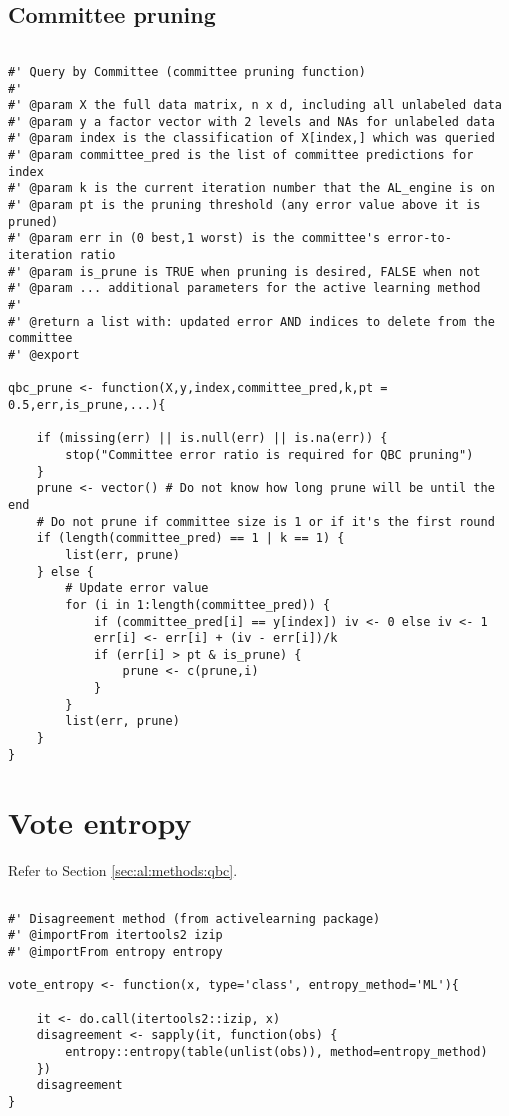 \subsection{Committee pruning}
{
\begin{lstlisting}

#' Query by Committee (committee pruning function)
#'
#' @param X the full data matrix, n x d, including all unlabeled data
#' @param y a factor vector with 2 levels and NAs for unlabeled data
#' @param index is the classification of X[index,] which was queried
#' @param committee_pred is the list of committee predictions for index
#' @param k is the current iteration number that the AL_engine is on
#' @param pt is the pruning threshold (any error value above it is pruned)
#' @param err in (0 best,1 worst) is the committee's error-to-iteration ratio
#' @param is_prune is TRUE when pruning is desired, FALSE when not
#' @param ... additional parameters for the active learning method
#'
#' @return a list with: updated error AND indices to delete from the committee
#' @export

qbc_prune <- function(X,y,index,committee_pred,k,pt = 0.5,err,is_prune,...){

	if (missing(err) || is.null(err) || is.na(err)) {
		stop("Committee error ratio is required for QBC pruning")
	}
	prune <- vector() # Do not know how long prune will be until the end
	# Do not prune if committee size is 1 or if it's the first round
	if (length(committee_pred) == 1 | k == 1) {
		list(err, prune)
	} else {
		# Update error value
		for (i in 1:length(committee_pred)) {
			if (committee_pred[i] == y[index]) iv <- 0 else iv <- 1
			err[i] <- err[i] + (iv - err[i])/k
			if (err[i] > pt & is_prune) {
				prune <- c(prune,i)
			}
		}
		list(err, prune)
	}
}
\end{lstlisting}
}

\section{Vote entropy}
\label{sec:appendicies:al:entropy}

Refer to Section \ref{sec:al:methods:qbc}.
{
\begin{lstlisting}

#' Disagreement method (from activelearning package)
#' @importFrom itertools2 izip
#' @importFrom entropy entropy

vote_entropy <- function(x, type='class', entropy_method='ML'){

	it <- do.call(itertools2::izip, x)
	disagreement <- sapply(it, function(obs) {
		entropy::entropy(table(unlist(obs)), method=entropy_method)
	})
	disagreement
}
\end{lstlisting}
}




